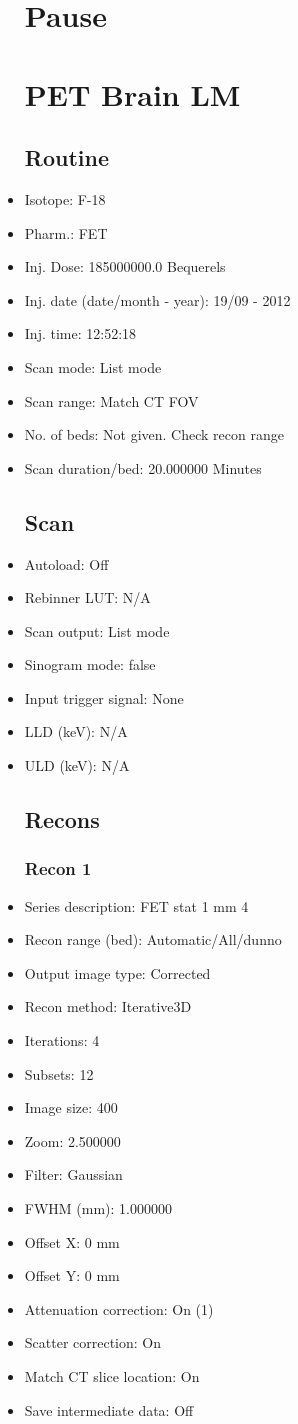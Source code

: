 \documentclass[12pt]{article}
\begin{document}
\begin{itemize}
\section{Pause}
\section{PET Brain LM}\subsection{Routine}
\item Isotope: F-18
\item Pharm.: FET
\item Inj. Dose: 185000000.0 Bequerels
\item Inj. date (date/month - year): 19/09 - 2012
\item Inj. time: 12:52:18
\item Scan mode: List mode
\item Scan range: Match CT FOV
\item No. of beds: Not given. Check recon range
\item Scan duration/bed: 20.000000 Minutes
\subsection{Scan}
\item Autoload: Off
\item Rebinner LUT: N/A
\item Scan output: List mode
\item Sinogram mode: false
\item Input trigger signal: None
\item LLD (keV): N/A
\item ULD (keV): N/A
\subsection{Recons}
\subsubsection{Recon 1}
\item Series description: FET stat 1 mm 4
\item Recon range (bed): Automatic/All/dunno
\item Output image type: Corrected
\item Recon method: Iterative3D
\item Iterations: 4
\item Subsets: 12
\item Image size: 400
\item Zoom: 2.500000
\item Filter: Gaussian
\item FWHM (mm): 1.000000
\item Offset X: 0 mm
\item Offset Y: 0 mm
\item Attenuation correction: On (1)
\item Scatter correction: On
\item Match CT slice location: On
\item Save intermediate data: Off

\end{itemize}
\end{document}
